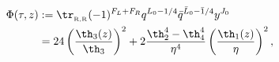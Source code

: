 \begin{equation}\label{ell-genus}
  \begin{split}
    \Phi (\tau,z) &:= \tr_{_{\rm R,R}} (-1)^{F_L+F_R} q^{L_0-1/4} \bar
  q^{\bar L_0-\bar 1/4} y^{J_0} \\
  &= 24\left(\frac{\th_3(z)}{\th_3}
  \right)^2 +2 \frac{\th_2^4-\th_4^4}{\eta^4} \left(
   {\th_1(z)\over\eta} \right)^2  ,
  \end{split}
\end{equation}

